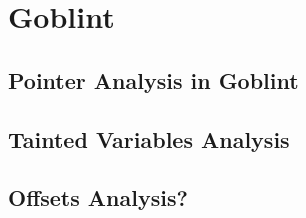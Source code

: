 \section{Goblint}

\subsection{Pointer Analysis in Goblint}

\subsection{Tainted Variables Analysis}

\subsection{Offsets Analysis?}
